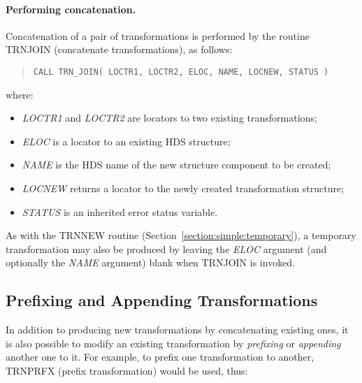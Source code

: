 \documentclass[twoside,11pt]{article}
\newcommand{\xlabel}[1]{}
\renewcommand{\_}{\texttt{\symbol{95}}}
\newcommand{\name}[1]{\mbox{\small{#1}}}
\newcommand{\fortvar}[1]{\mbox{\emph{#1}}}
\begin{document}
\paragraph{Performing concatenation.}
Concatenation of a pair of transformations is performed by the routine
\name{TRN\_JOIN} (concatenate transformations), as follows:

\begin{quote}
\begin{verbatim}
CALL TRN_JOIN( LOCTR1, LOCTR2, ELOC, NAME, LOCNEW, STATUS )
\end{verbatim}
\end{quote}

where:

\begin{itemize}

\item \fortvar{LOCTR1} and \fortvar{LOCTR2} are locators to two existing
transformations;

\item \fortvar{ELOC} is a locator to an existing \name{HDS} structure;

\item \fortvar{NAME} is the \name{HDS} name of the new structure component
to be created;

\item \fortvar{LOCNEW} returns a locator to the newly created transformation
structure;

\item \fortvar{STATUS} is an inherited error status variable.

\end{itemize}

As with the \name{TRN\_NEW} routine
(Section~\ref{section:simple:temporary}), a temporary transformation may
also be produced by leaving the \fortvar{ELOC} argument (and optionally the
\fortvar{NAME} argument) blank when \name{TRN\_JOIN} is invoked.


\subsection{\xlabel{prefixing_and_appending_transformations}Prefixing and Appending Transformations}

\label{section:additional:prefix}

In addition to producing new transformations by concatenating existing ones,
it is also possible to modify an existing transformation by \emph{prefixing}
or \emph{appending} another one to it.
For example, to prefix one transformation to another, \name{TRN\_PRFX}
(prefix transformation) would be used, thus:
\end{document}
